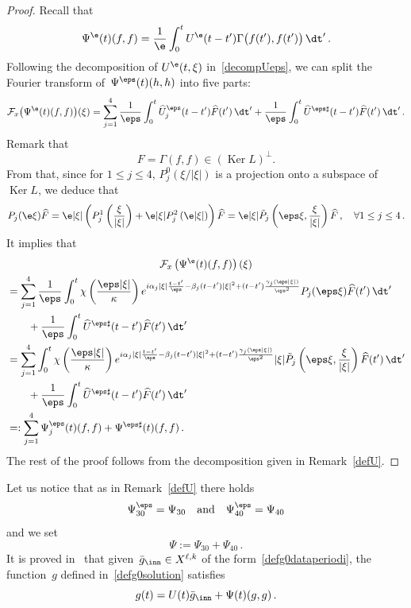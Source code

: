 \begin{proof}
Recall that
\[
\Psi^\e(t) (f,f) =\frac1\e \int_0^t U^\e (t-t') \Gamma \big(f(t'),f(t')\big) \, \dt' \,.
\]
Following the decomposition of $ U^\e(t,\xi)$ in~\eqref{decompUeps}, we can split the Fourier transform of~$\Psi^\eps(t)(h,h)$ into five parts:
\[
\mathcal{F}_x\big({\Psi^\e(t) (f,f)}\big)(\xi) = \sum_{j=1}^4 \frac{1}{\eps} \int_0^t \widehat U^\eps_j(t-t') \widehat F(t') \, \dt' +\frac{1}{\eps} \int_0^t \widehat U^{\eps\sharp}(t- t') \widehat F(t') \, \dt'\,.
\]
Remark that
\[
F=\Gamma(f,f) \in (\operatorname{Ker} L)^\perp.
\]
From that, since for $1 \le j \le 4$, $P_j^0(\xi/|\xi|)$ is a projection onto a subspace of $\operatorname{Ker} L$, we deduce that
\[
P_j(\e \xi) \widehat F = \e |\xi| \left(P_j^1 \left(\frac{\xi}{|\xi|}\right) + \e |\xi| P_j^2 \left(\e|\xi|\right)\right)\widehat F =\e |\xi| \tilde P_j\left(\eps \xi, \frac{\xi}{|\xi|}\right) \widehat F\,, \quad \forall 1 \le j \le 4 \,.
\]
It implies that
\begin{multline*}
\mathcal{F}_x\left({\Psi^\e(t) (f,f)}\right)(\xi) \\
\begin{aligned}
& = \sum_{j=1}^4 \frac{1}{\eps} \int_0^t \chi\left(\frac{\eps |\xi|} \kappa\right)e^{i\alpha_j|\xi|\frac{{t-t'}}{\eps}-\beta_j(t-t')|\xi|^2+(t-t')\frac{\gamma_j(\eps|\xi|)}{\eps^2}} P_j(\eps \xi) \widehat F(t') \, \dt' \\
&\qquad +\frac{1}{\eps} \int_0^t \widehat U^{\eps\sharp}(t-t') \widehat F(t') \, \dt' \\
& = \sum_{j=1}^4 \int_0^t \chi\left(\frac{\eps |\xi|} \kappa\right)e^{i\alpha_j|\xi|\frac{{t-t'}}{\eps}-\beta_j(t-t')|\xi|^2+(t-t')\frac{\gamma_j(\eps|\xi|)}{\eps^2}} |\xi| \tilde P_j\left(\eps \xi, \frac{\xi}{|\xi|}\right) \widehat F(t') \, \dt' \\
&\qquad +\frac{1}{\eps} \int_0^t \widehat U^{\eps\sharp}(t-t') \widehat F(t') \, \dt' \\
& =: \sum_{j=1}^4\Psi^\eps_j(t)(f,f) + \Psi^{\eps \sharp}(t)(f,f) \,.
\end{aligned}
\end{multline*}
The rest of the proof follows from the decomposition given in Remark~\ref{defU}.
\end{proof}

\begin{rema}\label{defPsi}
Let us notice that as in Remark~\ref{defU} there holds
\[
\Psi^\eps_{30} = \Psi_{30} \quad \text{and}\quad \Psi^\eps_{40} = \Psi_{40}
\]
and we set
\[
\Psi := \Psi_{30}+ \Psi_{40} \,.
\]
It is proved in~\cite{Bardos-Ukai} that given~$\bar g_{\inn} \in X^{{\ell},k}$ of the form~\eqref{defg0dataperiodi}, the function~$g$ defined in~\eqref{defg0solution} satisfies
\[
g(t) =U (t) \bar g_{\inn} + \Psi(t) (g,g) \,.
\]
\end{rema}

